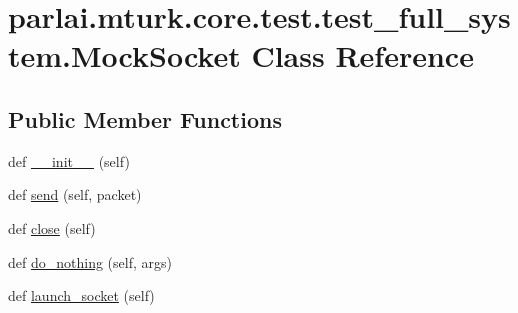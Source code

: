 \hypertarget{classparlai_1_1mturk_1_1core_1_1test_1_1test__full__system_1_1MockSocket}{}\section{parlai.\+mturk.\+core.\+test.\+test\+\_\+full\+\_\+system.\+Mock\+Socket Class Reference}
\label{classparlai_1_1mturk_1_1core_1_1test_1_1test__full__system_1_1MockSocket}
\subsection*{Public Member Functions}
\begin{DoxyCompactItemize}
\item 
def \hyperlink{classparlai_1_1mturk_1_1core_1_1test_1_1test__full__system_1_1MockSocket_a2f3062cf26828b0b213e4ddaf0ebbde5}{\+\_\+\+\_\+init\+\_\+\+\_\+} (self)
\item 
def \hyperlink{classparlai_1_1mturk_1_1core_1_1test_1_1test__full__system_1_1MockSocket_adfde729d82337cbb4bd1757c18fe92f6}{send} (self, packet)
\item 
def \hyperlink{classparlai_1_1mturk_1_1core_1_1test_1_1test__full__system_1_1MockSocket_ad8f95da992b7df7b8c823bd98d014491}{close} (self)
\item 
def \hyperlink{classparlai_1_1mturk_1_1core_1_1test_1_1test__full__system_1_1MockSocket_a029402a28285fd5fa2003d7058423a42}{do\+\_\+nothing} (self, args)
\item 
def \hyperlink{classparlai_1_1mturk_1_1core_1_1test_1_1test__full__system_1_1MockSocket_a5ef66154889f440bcdb0888e48b953f2}{launch\+\_\+socket} (self)
\end{DoxyCompactItemize}
